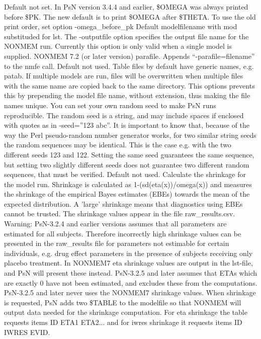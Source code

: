 \begin{optionlist}
\nextopt
{}
Default not set. In PsN version 3.4.4 and earlier, \$OMEGA was always printed before \$PK. The new default is to print \$OMEGA after \$THETA. To use the old print order, set option -omega\_before\_pk 
\nextopt
{}
Default modelfilename with mod substituded for lst. The -outputfile option specifies the output file name for the NONMEM run. Currently this option is only valid when a single model is supplied. 
\nextopt
{}
NONMEM 7.2 (or later version) parafile. Appends “-parafile=filename” to the nmfe call. 
\nextopt
{}
Default not used. Table files by default have generic names, e.g. patab. If multiple models are run, files will be overwritten when multiple files with the same name are copied back to the same directory. This options prevents this by prepending the model file name, without extension, thus making the file names unique. 
\nextopt
{}
You can set your own random seed to make PsN runs reproducible.
The random seed is a string, and may include spaces if enclosed with
quotes as in -seed=''123 abc''. It is important to know that, because of the way the Perl pseudo-random
number generator works, for two similar string seeds the random sequences may be identical. 
This is the case e.g. with the two different seeds 123 and 122. 
Setting the same seed guarantees the same sequence, but setting two slightly different 
seeds does not guarantee two different random sequences, that must be verified.
\nextopt
{}
Default not used. Calculate the shrinkage for the model run.  Shrinkage is calculated as 1-(sd(eta(x))/omega(x)) and measures the shrinkage of the empirical Bayes estimates (EBEs) towards the mean of the expected distribution.  A 'large' shrinkage means that diagnostics using EBEs cannot be trusted. The shrinkage values appear in the file raw\_results.csv. Warning: PsN-3.2.4 and earlier versions assumes that all parameters are estimated for all subjects. Therefore incorrectly high shrinkage values can be presented in the raw\_results file for parameters not estimable for certain individuals, e.g. drug effect parameters in the presence of subjects receiving only placebo treatment. In NONMEM7 eta shrinkage values are output in the lst-file, and PsN will present these instead. PsN-3.2.5 and later assumes that ETAs which are exactly 0 have not been estimated, and excludes these from the computations. PsN-3.2.5 and later never uses the NONMEM7 shrinkage values. When shrinkage is requested, PsN adds two \$TABLE to the modelfile so that NONMEM will output data needed for the shrinkage computation. For eta shrinkage the table requests items ID ETA1 ETA2... and for iwres shrinkage it requests items ID IWRES EVID. 

\end{optionlist}
